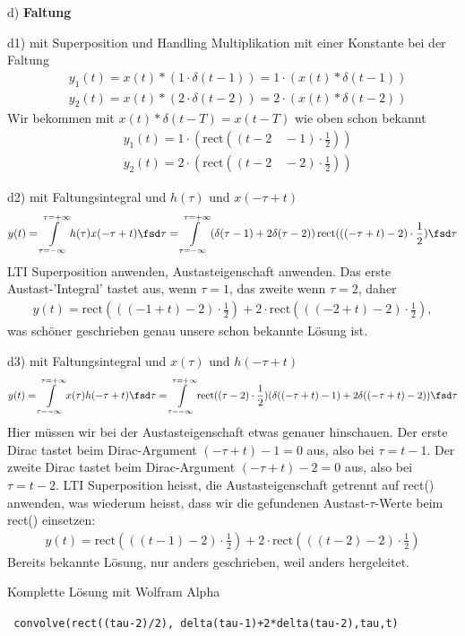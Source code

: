 \begin{ExCalc}
d) \textbf{Faltung}

\noindent d1) mit Superposition und Handling Multiplikation mit einer Konstante bei der Faltung
%
\begin{align}
&y_1(t) = x(t) \ast (1\cdot \delta(t-1)) =  1 \cdot (x(t) \ast \delta(t-1))\\
&y_2(t) = x(t) \ast (2\cdot \delta(t-2)) = 2 \cdot (x(t) \ast \delta(t-2))
\end{align}
%
Wir bekommen mit $x(t) \ast \delta(t-T) = x(t-T)$ wie oben schon bekannt
\begin{align}
&y_1(t) = 1 \cdot (\text{rect}\left((t-2 \quad - 1) \cdot \frac{1}{2}\right))\\
&y_2(t) = 2 \cdot (\text{rect}\left((t-2 \quad - 2) \cdot \frac{1}{2}\right))
\end{align}

\noindent d2) mit Faltungsintegral und $h(\tau)$ und $x(-\tau+t)$
\begin{align}
y(t) = \int\limits_{\tau=-\infty}^{\tau=+\infty} h(\tau) x(-\tau+t)\fsd\tau
= \int\limits_{\tau=-\infty}^{\tau=+\infty}
\left(\delta(\tau-1) + 2\delta(\tau-2)\right)\text{rect}(((-\tau+t)-2) \cdot \frac{1}{2})
\fsd\tau
\end{align}
LTI Superposition anwenden, Austasteigenschaft anwenden.
%
Das erste Austast-'Integral' tastet aus, wenn $\tau=1$, das zweite wenn $\tau=2$, daher
\begin{align}
y(t) =
\text{rect}(((-1+t)-2) \cdot \frac{1}{2}) + 2\cdot\text{rect}(((-2+t)-2) \cdot \frac{1}{2}),
\end{align}
was schöner geschrieben genau unsere schon bekannte Lösung ist.

\noindent d3) mit Faltungsintegral und $x(\tau)$ und $h(-\tau+t)$
\begin{align}
y(t) = \int\limits_{\tau=-\infty}^{\tau=+\infty} x(\tau) h(-\tau+t)\fsd\tau
= \int\limits_{\tau=-\infty}^{\tau=+\infty} \text{rect}((\tau-2) \cdot \frac{1}{2}) (\delta((-\tau+t)-1) + 2\delta((-\tau+t)-2)) \fsd\tau
\end{align}
Hier müssen wir bei der Austasteigenschaft etwas genauer hinschauen.
%
Der erste Dirac tastet beim Dirac-Argument $(-\tau+t)-1 = 0$ aus, also bei $\tau = t-1$.
%
Der zweite Dirac tastet beim Dirac-Argument $(-\tau+t)-2 = 0$ aus, also bei $\tau = t-2$.
%
LTI Superposition heisst, die Austasteigenschaft getrennt auf rect() anwenden, was wiederum heisst, dass
wir die gefundenen Austast-$\tau$-Werte beim rect() einsetzen:
\begin{align}
y(t) = \text{rect}(((t-1)-2) \cdot \frac{1}{2}) + 2\cdot\text{rect}(((t-2)-2) \cdot \frac{1}{2})
\end{align}
Bereits bekannte Lösung, nur anders geschrieben, weil anders hergeleitet.

\noindent Komplette Lösung mit Wolfram Alpha

\verb| convolve(rect((tau-2)/2), delta(tau-1)+2*delta(tau-2),tau,t) |
\end{ExCalc}









